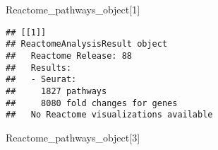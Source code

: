 \documentclass[
]{article}
\newenvironment{Shaded}{\begin{snugshade}}{\end{snugshade}}
\newcommand{\DecValTok}[1]{\textcolor[rgb]{0.00,0.00,0.81}{#1}}
\newcommand{\NormalTok}[1]{#1}
\begin{document}
\begin{Shaded}
\begin{Highlighting}[]
\NormalTok{Reactome\_pathways\_object[}\DecValTok{1}\NormalTok{]}
\end{Highlighting}
\end{Shaded}

\begin{verbatim}
## [[1]]
## ReactomeAnalysisResult object
##   Reactome Release: 88
##   Results:
##   - Seurat:
##     1827 pathways
##     8080 fold changes for genes
##   No Reactome visualizations available
\end{verbatim}

\begin{Shaded}
\begin{Highlighting}[]
\NormalTok{Reactome\_pathways\_object[}\DecValTok{3}\NormalTok{]}
\end{Highlighting}
\end{Shaded}
\end{document}
